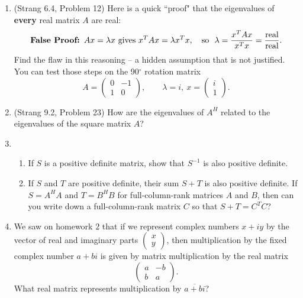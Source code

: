 \documentclass[11pt]{article}
\begin{document}
\begin{enumerate}
\item (Strang 6.4, Problem 12) Here is a quick ``proof" that the eigenvalues of \textbf{every} real matrix $A$ are real:
\[\text{\textbf{False Proof: }} Ax = \lambda x \text{ gives } x^TAx = \lambda x^Tx, \quad \text{so } \ \lambda  = \frac{ x^TAx}{x^Tx} = \frac{\text{real}}{\text{real}}.\]
Find the flaw in this reasoning -- a hidden assumption that is not justified.  You can test those steps on the 90${}^\circ$ rotation matrix
\[ A = \begin{pmatrix} 0 & -1 \\  1 & 0 \end{pmatrix}, \qquad \lambda =  i, \ x = \begin{pmatrix} i \\ 1 \end{pmatrix}.\]


\item (Strang 9.2, Problem 23) How are the eigenvalues of $A^H$ related to the eigenvalues of the square matrix $A$?


\item 

\begin{enumerate}
\item If $S$ is a positive definite matrix, show that $S^{-1}$ is also positive definite.
\item If $S$ and $T$ are positive definite, their sum $S + T$ is also positive definite.  If $S = A^HA$ and $T = B^HB$ for full-column-rank matrices $A$ and $B$, then can you write down a full-column-rank matrix $C$ so that $S +T = C^TC$?
\end{enumerate}

\item We saw on homework $2$ that if we represent complex numbers $x + iy$ by the vector of real and imaginary parts $\begin{pmatrix} x \\  y \end{pmatrix}$, then multiplication by the fixed complex number $a + bi$ is given by matrix multiplication by the real matrix
\[\begin{pmatrix} a & -b \\ b & a \end{pmatrix}. \]
What real matrix represents multiplication by $\overline{a + bi}$?











\end{enumerate}
\end{document}
